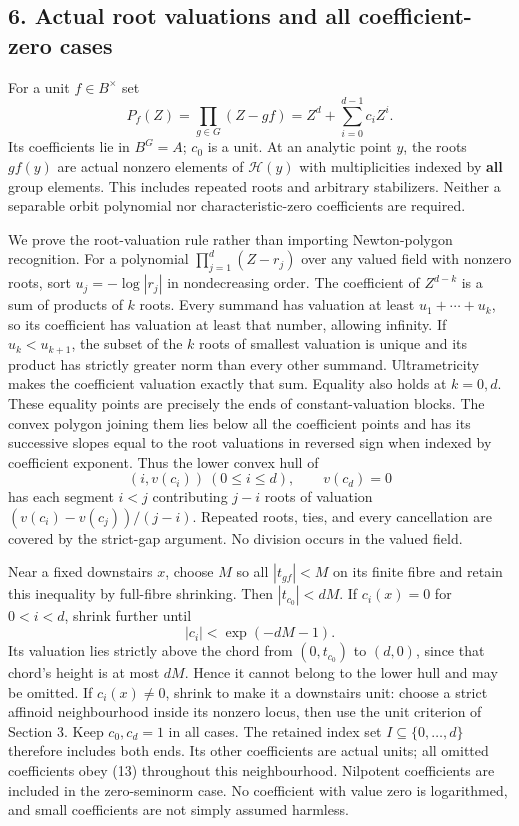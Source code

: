\documentclass[
  11pt,
]{article}
\begin{document}
\subsection{6. Actual root valuations and all coefficient-zero
cases}\label{actual-root-valuations-and-all-coefficient-zero-cases}

For a unit \(f\in B^\times\) set \[
 P_f(Z)=\prod_{g\in G}(Z-gf)
             =Z^d+\sum_{i=0}^{d-1}c_iZ^i.               \tag{11}
\] Its coefficients lie in \(B^G=A\); \(c_0\) is a unit. At an analytic
point \(y\), the roots \(gf(y)\) are actual nonzero elements of
\(\mathcal H(y)\) with multiplicities indexed by \textbf{all} group
elements. This includes repeated roots and arbitrary stabilizers.
Neither a separable orbit polynomial nor characteristic-zero
coefficients are required.

We prove the root-valuation rule rather than importing Newton-polygon
recognition. For a polynomial \(\prod_{j=1}^d(Z-r_j)\) over any valued
field with nonzero roots, sort \(u_j=-\log|r_j|\) in nondecreasing
order. The coefficient of \(Z^{d-k}\) is a sum of products of \(k\)
roots. Every summand has valuation at least \(u_1+\cdots+u_k\), so its
coefficient has valuation at least that number, allowing infinity. If
\(u_k<u_{k+1}\), the subset of the \(k\) roots of smallest valuation is
unique and its product has strictly greater norm than every other
summand. Ultrametricity makes the coefficient valuation exactly that
sum. Equality also holds at \(k=0,d\). These equality points are
precisely the ends of constant-valuation blocks. The convex polygon
joining them lies below all the coefficient points and has its
successive slopes equal to the root valuations in reversed sign when
indexed by coefficient exponent. Thus the lower convex hull of \[
          (i,v(c_i))\ (0\le i\le d),\qquad v(c_d)=0      \tag{12}
\] has each segment \(i<j\) contributing \(j-i\) roots of valuation
\((v(c_i)-v(c_j))/(j-i)\). Repeated roots, ties, and every cancellation
are covered by the strict-gap argument. No division occurs in the valued
field.

Near a fixed downstairs \(x\), choose \(M\) so all \(|t_{gf}|<M\) on its
finite fibre and retain this inequality by full-fibre shrinking. Then
\(|t_{c_0}|<dM\). If \(c_i(x)=0\) for \(0<i<d\), shrink further until \[
                      |c_i|<\exp(-dM-1).                \tag{13}
\] Its valuation lies strictly above the chord from \((0,t_{c_0})\) to
\((d,0)\), since that chord's height is at most \(dM\). Hence it cannot
belong to the lower hull and may be omitted. If \(c_i(x)\ne0\), shrink
to make it a downstairs unit: choose a strict affinoid neighbourhood
inside its nonzero locus, then use the unit criterion of Section 3. Keep
\(c_0,c_d=1\) in all cases. The retained index set
\(I\subseteq\{0,\ldots,d\}\) therefore includes both ends. Its other
coefficients are actual units; all omitted coefficients obey (13)
throughout this neighbourhood. Nilpotent coefficients are included in
the zero-seminorm case. No coefficient with value zero is logarithmed,
and small coefficients are not simply assumed harmless.
\end{document}
